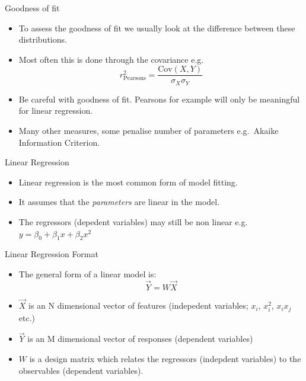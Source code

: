 \documentclass[
  ignorenonframetext,
]{beamer}
\begin{document}
\begin{frame}{Goodness of fit}
\protect\hypertarget{goodness-of-fit}{}
\begin{itemize}
\item
  To assess the goodness of fit we usually look at the difference
  between these distributions.
\item
  Most often this is done through the covariance
  e.g.~\[ r^2_{\text{Pearsons}} = \frac{\text{Cov}(X,Y)}{\sigma_X \sigma_Y}\]
\item
  Be careful with goodness of fit. Pearsons for example will only be
  meaningful for linear regression.
\item
  Many other measures, some penalise number of parameters e.g.~Akaike
  Information Criterion.
\end{itemize}
\end{frame}

\begin{frame}{Linear Regression}
\protect\hypertarget{linear-regression}{}
\begin{itemize}
\item
  Linear regression is the most common form of model fitting.
\item
  It assumes that the \emph{parameters} are linear in the model.
\item
  The regressors (depedent variables) may still be non linear
  e.g.~\(y = \beta_0 + \beta_1 x + \beta_2 x^2\)
\end{itemize}
\end{frame}

\begin{frame}{Linear Regression Format}
\protect\hypertarget{linear-regression-format}{}
\begin{itemize}
\item
  The general form of a linear model is: \[ \vec{Y} = W \vec{X} \]
\item
  \(\vec{X}\) is an N dimensional vector of features (indepedent
  variables; \(x_i\), \(x_i^2\), \(x_ix_j\) etc.)
\item
  \(\vec{Y}\) is an M dimensional vector of responses (dependent
  variables)
\item
  \(W\) is a design matrix which relates the regressors (indepdent
  variables) to the observables (dependent variables).
\end{itemize}
\end{frame}
\end{document}
